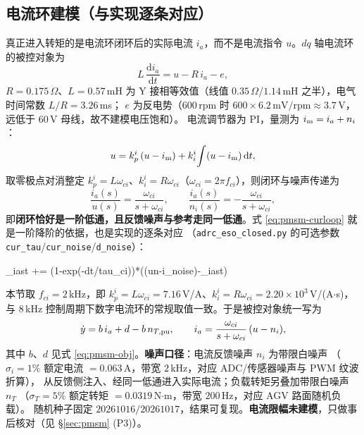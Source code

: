\documentclass[11pt]{article}
\theoremstyle{remark}\newtheorem{remark}{注}
\begin{document}
\subsection{电流环建模（与实现逐条对应）}\label{sec:pmsm-curloop}
真正进入转矩的是电流环闭环后的实际电流 $i_a$，而不是电流指令 $u$。$dq$ 轴电流环的被控对象为
\begin{equation}
L\,\frac{\mathrm di_a}{\mathrm dt}=u-R\,i_a-e,
\label{eq:pmsm-plant-elec}
\end{equation}
$R=0.175\,\Omega$、$L=0.57$\,mH 为 Y 接相等效值（线值 $0.35\,\Omega$/$1.14$\,mH 之半），电气时间常数 $L/R=3.26$\,ms；
$e$ 为反电势（$600$\,rpm 时 $600\times6.2\,\mathrm{mV/rpm}\approx3.7$\,V，远低于 $60$\,V 母线，故不建模电压饱和）。
电流调节器为 PI，量测为 $i_{\rm m}=i_a+n_i$：
\begin{equation}
u=k_p^{i}\,(u-i_{\rm m})+k_i^{i}\!\int(u-i_{\rm m})\,\mathrm dt,
\label{eq:pmsm-pi}
\end{equation}
取零极点对消整定 $k_p^{i}=L\omega_{ci}$、$k_i^{i}=R\omega_{ci}$（$\omega_{ci}=2\pi f_{ci}$），则闭环与噪声传递为
\begin{equation}
\frac{i_a(s)}{u(s)}=\frac{\omega_{ci}}{s+\omega_{ci}},\qquad
\frac{i_a(s)}{n_i(s)}=-\frac{\omega_{ci}}{s+\omega_{ci}},
\label{eq:pmsm-curloop}
\end{equation}
即\textbf{闭环恰好是一阶低通，且反馈噪声与参考走同一低通}。式 \eqref{eq:pmsm-curloop} 就是一阶降阶的依据，也是实现的逐条对应
（\texttt{adrc\_eso\_closed.py} 的可选参数 \texttt{cur\_tau}/\texttt{cur\_noise}/\texttt{d\_noise}）：
\begin{center}\ttfamily\small \_iast += (1-exp(-dt/tau\_ci))*((un-i\_noise)-\_iast)\end{center}本节取 $f_{ci}=2$\,kHz，即
$k_p^{i}=L\omega_{ci}=7.16$\,V/A、$k_i^{i}=R\omega_{ci}=2.20\times10^{3}$\,V/(A$\cdot$s)，
与 $8$\,kHz 控制周期下数字电流环的常规取值一致。于是被控对象统一写为
\begin{equation}
\dot y=b\,i_a+d-b\,n_{T,\rm pu},\qquad i_a=\frac{\omega_{ci}}{s+\omega_{ci}}\,(u-n_i),
\label{eq:pmsm-obj-final}
\end{equation}
其中 $b$、$d$ 见式 \eqref{eq:pmsm-obj}。\textbf{噪声口径}：电流反馈噪声 $n_i$ 为带限白噪声
（$\sigma_i=1\%$ 额定电流 $=0.063$\,A，带宽 $2$\,kHz，对应 ADC/传感器噪声与 PWM 纹波折算），
从反馈侧注入、经同一低通进入实际电流；负载转矩另叠加带限白噪声 $n_T$
（$\sigma_T=5\%$ 额定转矩 $=0.0319$\,N$\cdot$m，带宽 $200$\,Hz，对应 AGV 路面随机负载）。
随机种子固定 $20261016/20261017$，结果可复现。\textbf{电流限幅未建模}，只做事后核对（见 §\ref{sec:pmsm} (P3)）。
\end{document}

